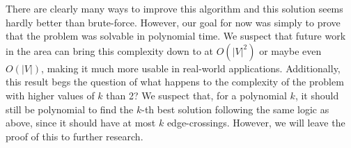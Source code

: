 There are clearly many ways to improve this algorithm and this solution seems hardly better than brute-force. However, our goal for now was simply to prove that the problem was solvable in polynomial time. We suspect that future work in the area can bring this complexity down to at $O(|V|^2)$ or maybe even $O(|V|)$, making it much more usable in real-world applications. Additionally, this result begs the question of what happens to the complexity of the problem with higher values of $k$ than 2? We suspect that, for a polynomial $k$, it should still be polynomial to find the $k$-th best solution following the same logic as above, since it should have at most $k$ edge-crossings. However, we will leave the proof of this to further research.





